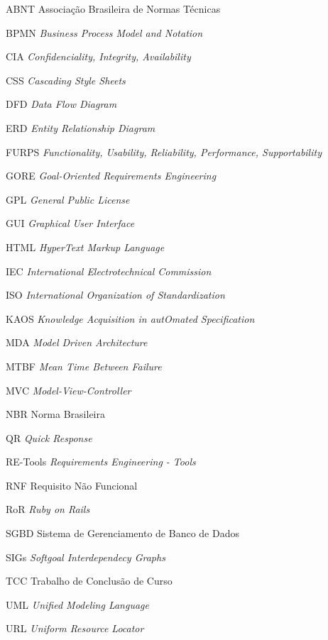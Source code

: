 \begin{siglas}
  \item[ABNT] Associação Brasileira de Normas Técnicas
  \item[BPMN] \textit{Business Process Model and Notation}
  \item[CIA] \textit{Confidenciality, Integrity, Availability}
  \item[CSS] \textit{Cascading Style Sheets}
  \item[DFD] \textit{Data Flow Diagram}
  \item[ERD] \textit{Entity Relationship Diagram}
  \item[FURPS] \textit{Functionality, Usability, Reliability, Performance, Supportability}
  \item[GORE] \textit{Goal-Oriented Requirements Engineering}
  \item[GPL] \textit{General Public License}
  \item[GUI] \textit{Graphical User Interface}
  \item[HTML] \textit{HyperText Markup Language}
  \item[IEC] \textit{International Electrotechnical Commission}
  \item[ISO] \textit{International Organization of Standardization}
  \item[KAOS] \textit{Knowledge Acquisition in autOmated Specification}
  \item[MDA] \textit{Model Driven Architecture}
  \item[MTBF] \textit{Mean Time Between Failure}
  \item[MVC] \textit{Model-View-Controller}
  \item[NBR] Norma Brasileira
  \item[QR] \textit{Quick Response}
  \item[RE-Tools] \textit{Requirements Engineering - Tools}
  \item[RNF] Requisito Não Funcional
  \item[RoR] \textit{Ruby on Rails}
  \item[SGBD] Sistema de Gerenciamento de Banco de Dados
  \item[SIGs] \textit{Softgoal Interdependecy Graphs}
  \item[TCC] Trabalho de Conclusão de Curso
  \item[UML] \textit{Unified Modeling Language}
  \item[URL] \textit{Uniform Resource Locator}
\end{siglas}
